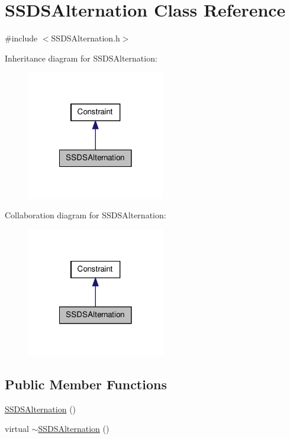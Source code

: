 \hypertarget{classSSDSAlternation}{\section{\-S\-S\-D\-S\-Alternation \-Class \-Reference}
\label{classSSDSAlternation}
}


{\ttfamily \#include $<$\-S\-S\-D\-S\-Alternation.\-h$>$}



\-Inheritance diagram for \-S\-S\-D\-S\-Alternation\-:
\nopagebreak
\begin{figure}[H]
\begin{center}
\leavevmode
\includegraphics[width=170pt]{classSSDSAlternation__inherit__graph}
\end{center}
\end{figure}


\-Collaboration diagram for \-S\-S\-D\-S\-Alternation\-:
\nopagebreak
\begin{figure}[H]
\begin{center}
\leavevmode
\includegraphics[width=170pt]{classSSDSAlternation__coll__graph}
\end{center}
\end{figure}
\subsection*{\-Public \-Member \-Functions}
\begin{DoxyCompactItemize}
\item 
\hyperlink{classSSDSAlternation_a4f163d6400aac19c61c47d7ce0bdd7fd}{\-S\-S\-D\-S\-Alternation} ()
\item 
virtual \hyperlink{classSSDSAlternation_ac5a0ff4ee8a18bb6ebaaa436a4a901ee}{$\sim$\-S\-S\-D\-S\-Alternation} ()
\end{DoxyCompactItemize}
